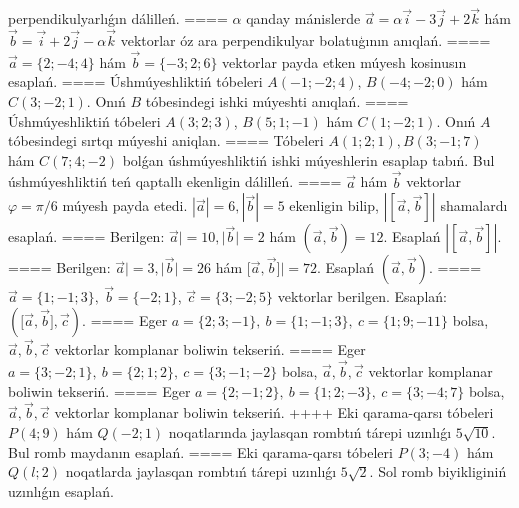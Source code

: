 perpendikulyarlıǵın dálilleń.
====
$\alpha$
qanday mánislerde
$\overrightarrow{a} = \alpha\overrightarrow{i} - 3\overrightarrow{j} + 2\overrightarrow{k}$
hám
$\overrightarrow{b} = \overrightarrow{i} + 2\overrightarrow{j} - \alpha\overrightarrow{k}$
vektorlar óz ara perpendikulyar bolatuģının anıqlań.
====
$\overrightarrow{a} = \{ 2; - 4;4\}$ hám $\overrightarrow{b} = \{ - 3;2;6\}$
vektorlar payda etken múyesh kosinusın esaplań.
====
Úshmúyeshliktiń tóbeleri
$A (- 1; - 2;4) $, $B (- 4; - 2;0) $ hám $C (3; -2;1) $. Onıń $B$ tóbesindegi
ishki múyeshti anıqlań.
====
Úshmúyeshliktiń tóbeleri
$A (3;2; 3) $, $B (5;1; - 1) $ hám $C (1; -2;1) $. Onıń $A$ tóbesindegi sırtqı múyeshi aniqlan.
====
Tóbeleri $A (1;2;1), B (3;-1;7) $ hám $C (7;4;-2) $ bolǵan úshmúyeshliktiń
ishki múyeshlerin esaplap tabıń. Bul úshmúyeshliktiń teń qaptallı ekenligin dálilleń.
====
$\overrightarrow{a}$ hám $\overrightarrow{b}$ vektorlar
$\varphi = \pi/6$ múyesh payda etedi.
$|\overrightarrow{a}| = 6,|\overrightarrow{b}| = 5$ ekenligin bilip,
$\left| \left\lbrack \overrightarrow{a},\overrightarrow{b} \right\rbrack \right|$ shamalardı esaplań.
====
Berilgen: $\overrightarrow{a}| = 10,|\overrightarrow{b}| = 2$ hám
$\left(\overrightarrow{a},\overrightarrow{b} \right) = 12$. Esaplań
$\left| \left\lbrack \overrightarrow{a},\overrightarrow{b} \right\rbrack \right|$.
====
Berilgen: $\overrightarrow{a}| = 3,|\overrightarrow{b}| = 26$ hám
$\lbrack\overrightarrow{a},\overrightarrow{b}\rbrack| = 72$. Esaplań
$\left(\overrightarrow{a},\overrightarrow{b} \right) $.
====
$\overrightarrow{a}
= \{ 1; - 1;3\}, \ \overrightarrow{b} = \{ - 2;1\}$, $\overrightarrow{c} = \{3; -2;5\}$ vektorlar berilgen. Esaplań:
$ (\lbrack\overrightarrow{a},\overrightarrow{b}\rbrack,\overrightarrow{c}) $.
====
Eger \(a = \{ 2;3; - 1\}, \ b = \{ 1; - 1;3\}, \ c = \{ 1;9; - 11\}\) bolsa, $\overrightarrow{a}, \overrightarrow{b}, \overrightarrow{c}$ vektorlar komplanar boliwin tekseriń.
====
Eger \(a = \{ 3; - 2;1\}, \ b = \{ 2;1;2\}, \ c = \{ 3; - 1; - 2\}\) bolsa, $\overrightarrow{a}, \overrightarrow{b}, \overrightarrow{c}$ vektorlar komplanar boliwin tekseriń.
====
Eger \(a = \{ 2; - 1;2\}, \ b = \{ 1;2; - 3\}, \ c = \{ 3; - 4;7\}\) bolsa, $\overrightarrow{a}, \overrightarrow{b}, \overrightarrow{c}$ vektorlar komplanar boliwin tekseriń.
++++
Eki qarama-qarsı tóbeleri \(P (4;9) \) hám \(Q (-2; 1) \) noqatlarında jaylasqan rombtıń tárepi uzınlıǵı \(5\sqrt{10}\). Bul
romb maydanın esaplań.
====
Eki qarama-qarsı tóbeleri $P (3; -4) $ hám $Q (l;2) $ noqatlarda jaylasqan rombtıń tárepi uzınlıǵı \(5\sqrt{2}\). Sol romb biyikliginiń uzınlıǵın esaplań.
